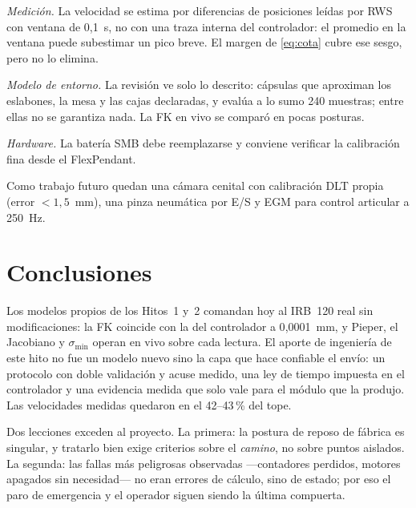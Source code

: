 \documentclass[conference]{IEEEtran}
\begin{document}
\emph{Medición.} La velocidad se estima por diferencias de posiciones
leídas por RWS con ventana de 0{,}1~s, no con una traza interna del
controlador: el promedio en la ventana puede subestimar un pico breve.
El margen de \eqref{eq:cota} cubre ese sesgo, pero no lo elimina.

\emph{Modelo de entorno.} La revisión ve solo lo descrito: cápsulas que
aproximan los eslabones, la mesa y las cajas declaradas, y evalúa a lo
sumo 240 muestras; entre ellas no se garantiza nada. La FK en vivo se
comparó en pocas posturas.

\emph{Hardware.} La batería SMB debe reemplazarse y conviene verificar la
calibración fina desde el FlexPendant.

Como trabajo futuro quedan una cámara cenital con calibración DLT propia
(error $<1{,}5$~mm), una pinza neumática por E/S y EGM para control
articular a 250~Hz.

\section{Conclusiones}

Los modelos propios de los Hitos~1 y~2 comandan hoy al IRB~120 real sin
modificaciones: la FK coincide con la del controlador a 0{,}0001~mm, y
Pieper, el Jacobiano y $\sigma_{\min}$ operan en vivo sobre cada lectura.
El aporte de ingeniería de este hito no fue un modelo nuevo sino la
capa que hace confiable el envío: un protocolo con doble validación y
acuse medido, una ley de tiempo impuesta en el controlador y una
evidencia medida que solo vale para el módulo que la produjo. Las
velocidades medidas quedaron en el 42--43\,\% del tope.

Dos lecciones exceden al proyecto. La primera: la postura de reposo de
fábrica es singular, y tratarlo bien exige criterios sobre el
\emph{camino}, no sobre puntos aislados. La segunda: las fallas más
peligrosas observadas ---contadores perdidos, motores apagados sin
necesidad--- no eran errores de cálculo, sino de estado; por eso el paro
de emergencia y el operador siguen siendo la última compuerta.
\end{document}
